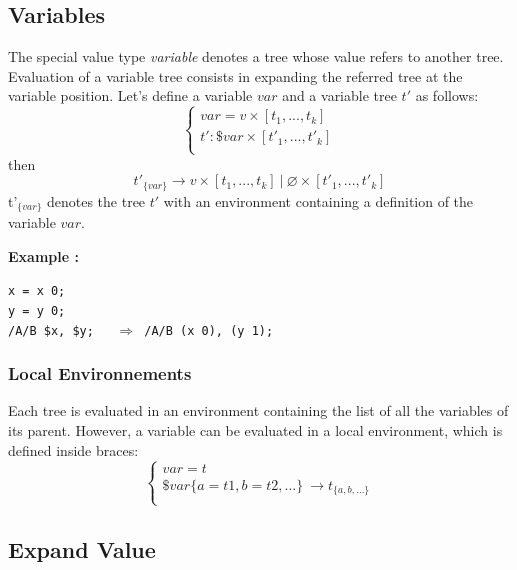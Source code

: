 \documentclass[runningheads]{llncs}
\newcommand{\exemple}	{\vspace*{1mm}\hspace*{-4mm}\textbf{Example :}}
\newcommand{\code}	[2][0.9]	{\vspace{0mm}\begin{center}\colorbox{mygrey}{
							\begin{minipage}[t]{#1\columnwidth} 
							{\small \texttt{#2}}
							\end{minipage}}\end{center}}
\newcommand{\llist}	[1]		{\ensuremath{[#1_1,...,#1_k]}}
\newcommand{\seq}		{\ensuremath{|}}
\newcommand{\forest}	{\ensuremath{\varnothing}}
\newcommand{\etc}		{\ensuremath{…}}
\begin{document}
\subsection{Variables}
The special value type \emph{variable} denotes a tree whose value refers to another tree.
Evaluation of a variable tree consists in expanding the referred tree at the variable position.
Let's define a variable $var$ and a variable tree $t'$ as follows:
\[
\left\{
\begin{array}{l}
	var = v \times \llist{t} \\
	t' : \$var \times \llist{t'}\\
\end{array}
\right.
\]
then 
\[
	t'_{\{var\}}  \to v \times \llist{t}\ \seq\ \forest \times \llist{t'}
\]
t'$_{\{var\}}$ denotes the tree $t'$ with an environment containing a definition of the variable $var$.

\exemple
\code{x = x 0;\\
y = y 0;\\
/A/B \$x, \$y; \ \ $\Rightarrow$  /A/B (x 0), (y 1);}


\subsubsection{Local Environnements}

Each tree is evaluated in an environment containing the list of all the variables of its parent. However, a variable can be evaluated in a local environment, which is defined inside braces:
\[
\left\{
\begin{array}{l}
	var = t \\
	\$var\{a=t1, b=t2,\etc\} \ \to  t_{\{a, b,\etc\}} \\
\end{array}
\right.
\]


\subsection{Expand Value}
\end{document}
